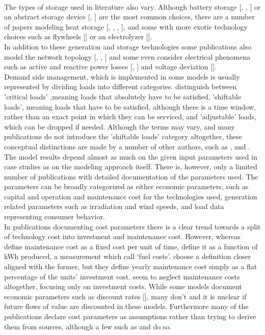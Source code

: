 \documentclass[
	11pt,								%
	DIV10,								%
	a4paper,         					%
	oneside,							%
	headheight=20pt,					%
	footheight=20pt,					%
    parskip=full,						%
    listof=totoc,						%
	bibliography=totoc,					%
	index=totoc,						%
]{scrartcl}
\begin{document}
\\
The types of storage used in literature also vary. Although battery storage [\cite{7399422}, \cite{UMEOZOR2016272}, \cite{6465822}] or an abstract storage device [\cite{6669807}, \cite{zhang2011optimal}] are the most common choices, there are a number of papers modeling heat storage [\cite{zhang2013efficient}, \cite{zhang2015optimal}, \cite{LAUINGER201624}, \cite{wouters2015energy}], and some with more exotic technology choices such as flywheels [\cite{6700453}] or an electrolyzer [\cite{7125149}].
\\
In addition to these generation and storage technologies some publications also model the network topology [\cite{8023785}, \cite{7972908}, \cite{SHAMS2018326}] and some even consider electrical phenomena such as active and reactive power losses [\cite{7741704}, \cite{mashayekhMixedIntegerLinear2017}] and voltage deviation [\cite{7741704}]. 
\\
Demand side management, which is implemented in some models is usually represented by dividing loads into different categories. \cite{7972908} distinguish between 'critical loads' ,meaning loads that absolutely have to be satisfied, 'shiftable loads', meaning loads that have to be satisfied, although there is a time window, rather than an exact point in which they can be serviced, and 'adjustable' loads, which can be dropped if needed. Although the terms may vary, and many publications do not introduce the 'shiftable loads' category altogether, these conceptual distinctions are made by a number of other authors, such as  \cite{silvente2015rolling}, \cite{zhang2015optimal} and \cite{8216436}.
\\
The model results depend almost as much on the given input parameters used in case studies as on the modeling approach itself. There is, however, only a limited number of publications with detailed documentation of the parameters used.
The parameters can be broadly categorized as either economic parameters, such as capital and operation and maintenance cost for the technologies used, generation related parameters such as irradiation and wind speeds, and load data representing consumer behavior.
\\
In publications documenting cost parameters there is a clear trend towards a split of technology cost into investment and maintenance cost. However, whereas \cite{LAUINGER201624} define maintenance cost as a fixed cost per unit of time, \cite{wouters2015energy} define it as a function of kWh produced, a measurement which \cite{LAUINGER201624} call `fuel costs'. \cite{7399422} choose a definition closer aligned with the former, but they define yearly maintenance cost simply as a flat percentage of the units' investment cost. \cite{KOLTSAKLIS2018318} seem to neglect maintenance costs altogether, focusing only on investment costs. While some models document economic parameters such as discount rates [\cite{7399422}], many don't and it is unclear if future flows of value are discounted in these models. Furthermore many of the publications declare cost parameters as assumptions rather than trying to derive them from sources, although a few such as \cite{LAUINGER201624} and \cite{wouters2015energy} do so.
\end{document}
